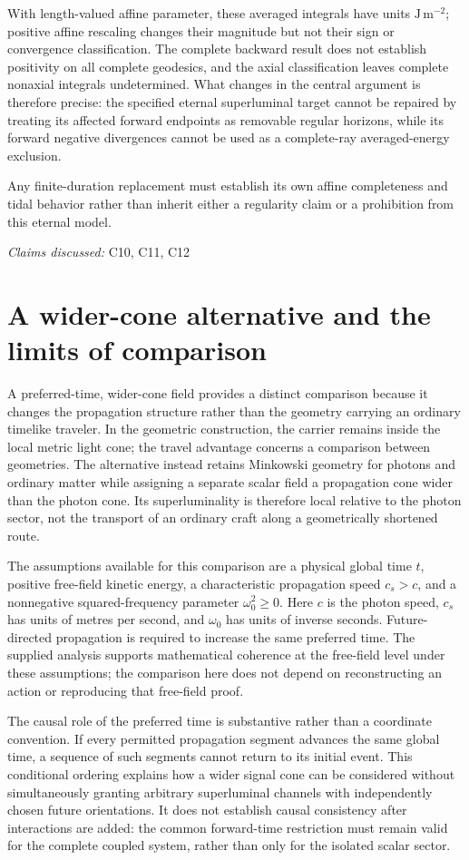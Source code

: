 \documentclass[11pt]{article}
\begin{document}
With length-valued affine parameter, these averaged integrals have units $\mathrm{J\,m^{-2}}$; positive affine rescaling changes their magnitude but not their sign or convergence classification. The complete backward result does not establish positivity on all complete geodesics, and the axial classification leaves complete nonaxial integrals undetermined. What changes in the central argument is therefore precise: the specified eternal superluminal target cannot be repaired by treating its affected forward endpoints as removable regular horizons, while its forward negative divergences cannot be used as a complete-ray averaged-energy exclusion.

Any finite-duration replacement must establish its own affine completeness and tidal behavior rather than inherit either a regularity claim or a prohibition from this eternal model.

\textit{Claims discussed: }C10, C11, C12
\section{A wider-cone alternative and the limits of comparison}
A preferred-time, wider-cone field provides a distinct comparison because it changes the propagation structure rather than the geometry carrying an ordinary timelike traveler. In the geometric construction, the carrier remains inside the local metric light cone; the travel advantage concerns a comparison between geometries. The alternative instead retains Minkowski geometry for photons and ordinary matter while assigning a separate scalar field a propagation cone wider than the photon cone. Its superluminality is therefore local relative to the photon sector, not the transport of an ordinary craft along a geometrically shortened route.

The assumptions available for this comparison are a physical global time $t$, positive free-field kinetic energy, a characteristic propagation speed $c_s>c$, and a nonnegative squared-frequency parameter $\omega_0^2\geq 0$. Here $c$ is the photon speed, $c_s$ has units of metres per second, and $\omega_0$ has units of inverse seconds. Future-directed propagation is required to increase the same preferred time. The supplied analysis supports mathematical coherence at the free-field level under these assumptions; the comparison here does not depend on reconstructing an action or reproducing that free-field proof.

The causal role of the preferred time is substantive rather than a coordinate convention. If every permitted propagation segment advances the same global time, a sequence of such segments cannot return to its initial event. This conditional ordering explains how a wider signal cone can be considered without simultaneously granting arbitrary superluminal channels with independently chosen future orientations. It does not establish causal consistency after interactions are added: the common forward-time restriction must remain valid for the complete coupled system, rather than only for the isolated scalar sector.
\end{document}
